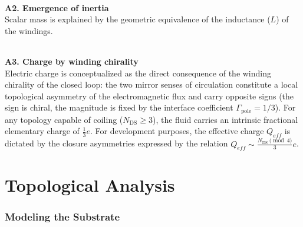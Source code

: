 \documentclass[11pt,a4paper]{article}
\theoremstyle{plain}
\theoremstyle{remark}
\newcommand{\Ncd}{\ensuremath{N_{\mathrm{DS}}}}
\begin{document}
\paragraph{}
\textbf{A2. Emergence of inertia}\\
Scalar mass is explained by the geometric equivalence of the inductance ($L$) of the windings.

\paragraph{}
\textbf{A3. Charge by winding chirality}\\
Electric charge is conceptualized as the direct consequence of the winding chirality of the closed loop: the two mirror senses of circulation constitute a local topological asymmetry of the electromagnetic flux and carry opposite signs (the sign is chiral, the magnitude is fixed by the interface coefficient $\Gamma_{\text{pole}} = 1/3$). For any topology capable of coiling ($\Ncd \ge 3$), the fluid carries an intrinsic fractional elementary charge of $\frac{1}{3}e$. For development purposes, the effective charge $Q_{eff}$ is dictated by the closure asymmetries expressed by the relation $Q_{eff} \sim \frac{\Ncd \pmod{4}}{3}e$.

\part{Topological Analysis}

\section{Modeling the Substrate}
\label{sec:modeling_space_r}
\end{document}

